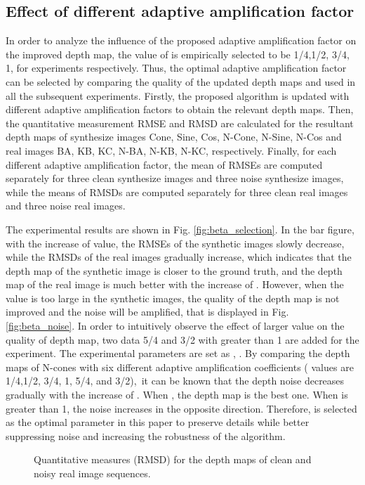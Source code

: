 \documentclass[a4paper,fleqn]{cas-dc}
\begin{document}
\subsection{Effect of different adaptive amplification factor}\label{Effect}
In order to analyze the influence of the proposed adaptive amplification factor on the improved depth map, the value of  is empirically selected to be 1/4,1/2, 3/4, 1, for experiments respectively. Thus, the optimal adaptive amplification factor can be selected by comparing the quality of the updated depth maps and used in all the subsequent experiments. Firstly, the proposed algorithm is updated with different adaptive amplification factors to obtain the relevant depth maps. Then, the quantitative measurement RMSE and RMSD are calculated for the resultant depth maps of synthesize images Cone, Sine, Cos, N-Cone, N-Sine, N-Cos and real images BA, KB, KC, N-BA, N-KB, N-KC, respectively. Finally, for each different adaptive amplification factor, the mean of RMSEs are computed separately for three clean synthesize images and three noise synthesize images, while the means of RMSDs are computed separately for three clean real images and three noise real images.

The experimental results are shown in Fig. \ref{fig:beta_selection}. In the bar figure, with the increase of  value, the RMSEs of the synthetic images slowly decrease, while the RMSDs of the real images gradually increase, which indicates that the depth map of the synthetic image is closer to the ground truth, and the depth map of the real image is much better with the increase of . However, when the  value is too large in the synthetic images, the quality of the depth map is not improved and the noise will be amplified, that is displayed in Fig. \ref{fig:beta_noise}. In order to intuitively observe the effect of larger  value on the quality of depth map, two data 5/4 and 3/2 with  greater than 1 are added for the experiment. The experimental parameters are set as , . By comparing the depth maps of N-cones with six different adaptive amplification coefficients ( values are 1/4,1/2, 3/4, 1, 5/4, and 3/2), it can be known that the depth noise decreases gradually with the increase of . When , the depth map is the best one. When  is greater than 1, the noise increases in the opposite direction. Therefore,  is selected as the optimal parameter in this paper to preserve details while better suppressing noise and increasing the robustness of the algorithm.

\begin{figure*}[htp]
	\centering
{}
	\caption{Quantitative measures (RMSD) for the depth maps of clean and noisy real image sequences.}
	\label{fig:QM_real}
	\vspace*{-0.4cm}
\end{figure*}
\end{document}
